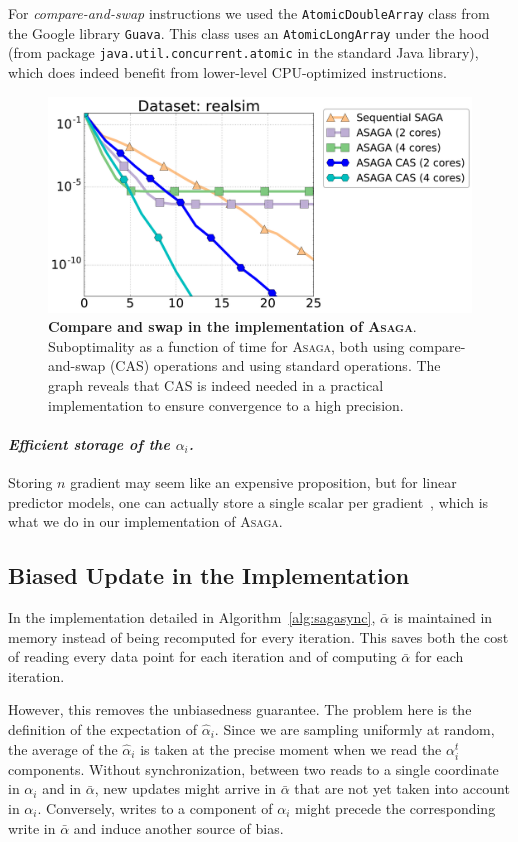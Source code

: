 \documentclass[twoside, 11pt]{article}
\newcommand{\ASAGA}{\textsc{Asaga}}
\begin{document}
For \textit{compare-and-swap} instructions we used the \texttt{AtomicDoubleArray} class from the Google library \texttt{Guava}. This class uses an \texttt{AtomicLongArray} under the hood (from package \texttt{java.util.concurrent.atomic} in the standard Java library), which does indeed benefit from lower-level CPU-optimized instructions.

\begin{figure}
\center \includegraphics[width=0.5 \linewidth]{figures/compare_and_swap.pdf}
\caption{{\bf Compare and swap in the implementation of \ASAGA}.
Suboptimality as a function of time for \ASAGA, both using compare-and-swap (CAS) operations and using standard operations.
The graph reveals that CAS is indeed needed in a practical implementation to ensure convergence to a high precision.} \label{fig:cas_comparison}
\end{figure}

\paragraph{\textit{Efficient storage of the $\alpha_i$.}}
Storing $n$ gradient may seem like an expensive proposition, but for linear predictor models, one can actually store a single scalar per gradient~\citep[as proposed in][]{laggedsaga}, which is what we do in our implementation of \ASAGA.

\subsection{Biased Update in the Implementation}\label{apx:Bias}
In the implementation detailed in Algorithm~\ref{alg:sagasync}, $\bar \alpha$ is maintained in memory instead of being recomputed for every iteration.
This saves both the cost of reading every data point for each iteration and of computing $\bar \alpha$ for each iteration.

However, this removes the unbiasedness guarantee.
The problem here is the definition of the expectation of $\hat \alpha_i$.
Since we are sampling uniformly at random, the average of the $\hat \alpha_i$ is taken at the precise moment when we read the $\alpha_i^t$ components.
Without synchronization, between two reads to a single coordinate in $\alpha_i$ and in $\bar \alpha$, new updates might arrive in $\bar \alpha$ that are not yet taken into account in $\alpha_i$.
Conversely, writes to a component of $\alpha_i$ might precede the corresponding write in $\bar \alpha$ and induce another source of bias.
\end{document}
